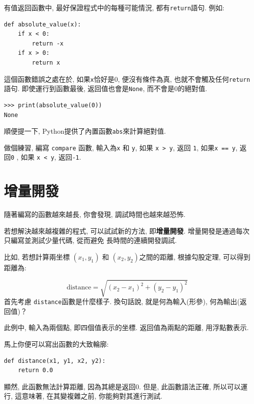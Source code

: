 \documentclass[10pt]{book}
\begin{document}
有值返回函數中, 最好保證程式中的每種可能情況, 都有{\tt return}語句. 例如:

\begin{verbatim}
def absolute_value(x):
    if x < 0:
        return -x
    if x > 0:
        return x
\end{verbatim}
%

這個函數錯誤之處在於, 如果{\tt x}恰好是0,
便沒有條件為真, 也就不會觸及任何{\tt return}語句. 
即使運行到函數最後, 返回值也會是{\tt None}, 而不會是0的絕對值. 

\begin{verbatim}
>>> print(absolute_value(0))
None
\end{verbatim}
%
順便提一下, Python提供了內置函數{\tt abs}來計算絕對值. 

做個練習, 編寫 {\tt compare} 函數, 輸入為{\tt x} 和 {\tt y}, 
如果 {\tt x > y},  返回 {\tt 1}, 
如果{\tt x == y},  返回{\tt 0} , 
如果 {\tt x < y},  返回{\tt -1}. 


\section{增量開發}
\label{incremental.development}

隨著編寫的函數越來越長, 你會發現, 調試時間也越來越恐怖. 

若想解決越來越複雜的程式, 可以試試新的方法, 即{\bf 增量開發}.
增量開發是通過每次只編寫並測試少量代碼, 從而避免
長時間的連續開發調試. 

比如, 若想計算兩坐標 $(x_1, y_1)$ 和 $(x_2, y_2)$之間的距離, 
根據勾股定理, 可以得到距離為:

\begin{displaymath}
\mathrm{distance} = \sqrt{(x_2 - x_1)^2 + (y_2 - y_1)^2}
\end{displaymath}
%
首先考慮 {\tt distance}函數是什麼樣子. 換句話說, 就是何為輸入(形參), 
何為輸出(返回值)？

此例中, 輸入為兩個點, 即四個值表示的坐標. 返回值為兩點的距離, 用浮點數表示. 

馬上你便可以寫出函數的大致輪廓:

\begin{verbatim}
def distance(x1, y1, x2, y2):
    return 0.0
\end{verbatim}
%
顯然, 此函數無法計算距離, 因為其總是返回0.
但是, 此函數語法正確, 所以可以運行, 
這意味著, 在其變複雜之前, 你能夠對其進行測試. 
\end{document}
